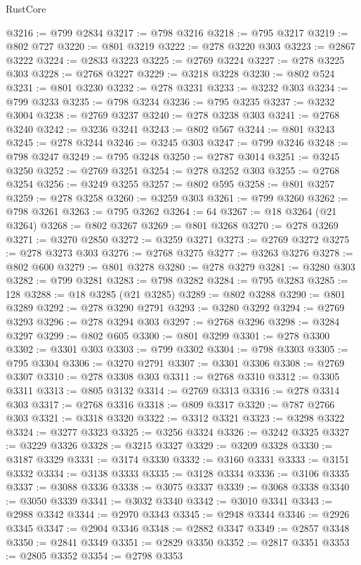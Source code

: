\begin{lexlean}{RustCore}
\begin{coremodule}
@3216 := @799 @2834
@3217 := @798 @3216
@3218 := @795 @3217
@3219 := @802 @727
@3220 := @801 @3219
@3222 := @278 @3220 @303
@3223 := @2867 @3222
@3224 := @2833 @3223
@3225 := @2769 @3224
@3227 := @278 @3225 @303
@3228 := @2768 @3227
@3229 := @3218 @3228
@3230 := @802 @524
@3231 := @801 @3230
@3232 := @278 @3231
@3233 := @3232 @303
@3234 := @799 @3233
@3235 := @798 @3234
@3236 := @795 @3235
@3237 := @3232 @3004
@3238 := @2769 @3237
@3240 := @278 @3238 @303
@3241 := @2768 @3240
@3242 := @3236 @3241
@3243 := @802 @567
@3244 := @801 @3243
@3245 := @278 @3244
@3246 := @3245 @303
@3247 := @799 @3246
@3248 := @798 @3247
@3249 := @795 @3248
@3250 := @2787 @3014
@3251 := @3245 @3250
@3252 := @2769 @3251
@3254 := @278 @3252 @303
@3255 := @2768 @3254
@3256 := @3249 @3255
@3257 := @802 @595
@3258 := @801 @3257
@3259 := @278 @3258
@3260 := @3259 @303
@3261 := @799 @3260
@3262 := @798 @3261
@3263 := @795 @3262
@3264 := 64
@3267 := @18 @3264 (@21 @3264)
@3268 := @802 @3267
@3269 := @801 @3268
@3270 := @278 @3269
@3271 := @3270 @2850
@3272 := @3259 @3271
@3273 := @2769 @3272
@3275 := @278 @3273 @303
@3276 := @2768 @3275
@3277 := @3263 @3276
@3278 := @802 @600
@3279 := @801 @3278
@3280 := @278 @3279
@3281 := @3280 @303
@3282 := @799 @3281
@3283 := @798 @3282
@3284 := @795 @3283
@3285 := 128
@3288 := @18 @3285 (@21 @3285)
@3289 := @802 @3288
@3290 := @801 @3289
@3292 := @278 @3290 @2791
@3293 := @3280 @3292
@3294 := @2769 @3293
@3296 := @278 @3294 @303
@3297 := @2768 @3296
@3298 := @3284 @3297
@3299 := @802 @605
@3300 := @801 @3299
@3301 := @278 @3300
@3302 := @3301 @303
@3303 := @799 @3302
@3304 := @798 @3303
@3305 := @795 @3304
@3306 := @3270 @2791
@3307 := @3301 @3306
@3308 := @2769 @3307
@3310 := @278 @3308 @303
@3311 := @2768 @3310
@3312 := @3305 @3311
@3313 := @805 @3132
@3314 := @2769 @3313
@3316 := @278 @3314 @303
@3317 := @2768 @3316
@3318 := @809 @3317
@3320 := @787 @2766 @303
@3321 := @3318 @3320
@3322 := @3312 @3321
@3323 := @3298 @3322
@3324 := @3277 @3323
@3325 := @3256 @3324
@3326 := @3242 @3325
@3327 := @3229 @3326
@3328 := @3215 @3327
@3329 := @3209 @3328
@3330 := @3187 @3329
@3331 := @3174 @3330
@3332 := @3160 @3331
@3333 := @3151 @3332
@3334 := @3138 @3333
@3335 := @3128 @3334
@3336 := @3106 @3335
@3337 := @3088 @3336
@3338 := @3075 @3337
@3339 := @3068 @3338
@3340 := @3050 @3339
@3341 := @3032 @3340
@3342 := @3010 @3341
@3343 := @2988 @3342
@3344 := @2970 @3343
@3345 := @2948 @3344
@3346 := @2926 @3345
@3347 := @2904 @3346
@3348 := @2882 @3347
@3349 := @2857 @3348
@3350 := @2841 @3349
@3351 := @2829 @3350
@3352 := @2817 @3351
@3353 := @2805 @3352
@3354 := @2798 @3353

\end{coremodule}
\end{lexlean}
